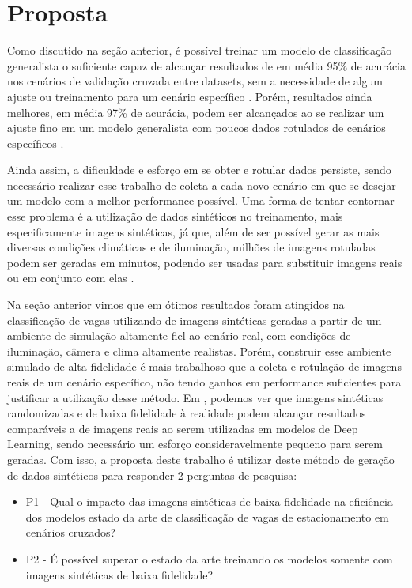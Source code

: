 \chapter{Proposta}


Como discutido na seção anterior, é possível treinar um modelo de classificação generalista o suficiente capaz de alcançar resultados de em média 95\% de acurácia nos cenários de validação cruzada entre datasets, sem a necessidade de algum ajuste ou treinamento para um cenário específico \citep{hochuli-2}. Porém, resultados ainda melhores, em média 97\% de acurácia, podem ser alcançados ao se realizar um ajuste fino em um modelo generalista com poucos dados rotulados de cenários específicos \citep{hochuli-1}.

Ainda assim, a dificuldade e esforço em se obter e rotular dados persiste, sendo necessário realizar esse trabalho de coleta a cada novo cenário em que se desejar um modelo com a melhor performance possível. Uma forma de tentar contornar esse problema é a utilização de dados sintéticos no treinamento, mais especificamente imagens sintéticas, já que, além de ser possível gerar as mais diversas condições climáticas e de iluminação, milhões de imagens rotuladas podem ser geradas em minutos, podendo ser usadas para substituir imagens reais ou em conjunto com elas \citep{objectPose} \citep{domain-random} \citep{fully-synthetic-training} \citep{synthetic-pedestrians}.

Na seção anterior vimos que em \citet{synthetic-parking2} ótimos resultados foram atingidos na classificação de vagas utilizando de imagens sintéticas geradas a partir de um ambiente de simulação altamente fiel ao cenário real, com condições de iluminação, câmera e clima altamente realistas. Porém, construir esse ambiente simulado de alta fidelidade é mais trabalhoso que a coleta e rotulação de imagens reais de um cenário específico, não tendo ganhos em performance suficientes para justificar a utilização desse método. Em \citet{domain-random}, podemos ver que imagens sintéticas randomizadas e de baixa fidelidade à realidade podem alcançar resultados comparáveis a de imagens reais ao serem utilizadas em modelos de Deep Learning, sendo necessário um esforço consideravelmente pequeno para serem geradas. Com isso, a proposta deste trabalho é utilizar deste método de geração de dados sintéticos para responder 2 perguntas de pesquisa:
\begin{itemize}
    \item P1 - Qual o impacto das imagens sintéticas de baixa fidelidade na eficiência dos modelos estado da arte de classificação de vagas de estacionamento em cenários cruzados?
    \item P2 - É possível superar o estado da arte treinando os modelos somente com imagens sintéticas de baixa fidelidade?
\end{itemize}

